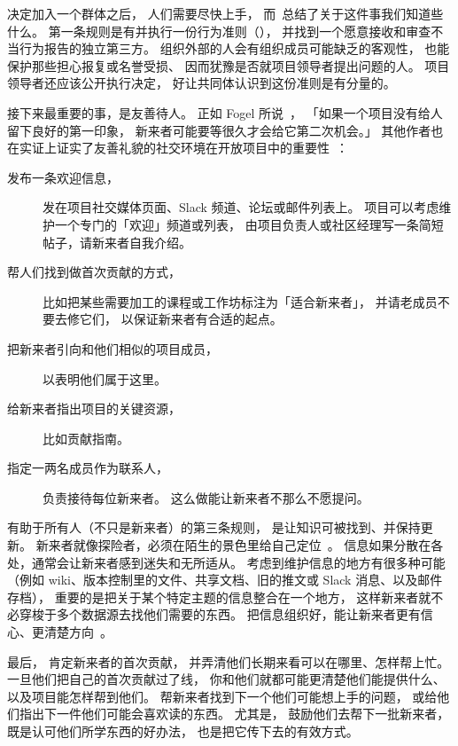 
决定加入一个群体之后，
人们需要尽快上手，
而~\cite{Shol2019}总结了关于这件事我们知道些什么。
第一条规则是有并执行一份行为准则（），
并找到一个愿意接收和审查不当行为报告的独立第三方。
组织外部的人会有组织成员可能缺乏的客观性，
也能保护那些担心报复或名誉受损、
因而犹豫是否就项目领导者提出问题的人。
项目领导者还应该公开执行决定，
好让共同体认识到这份准则是有分量的。

接下来最重要的事，是友善待人。
正如 Fogel 所说~\cite{Foge2005}，
「如果一个项目没有给人留下良好的第一印象，
新来者可能要等很久才会给它第二次机会。」
其他作者也在实证上证实了友善礼貌的社交环境在开放项目中的重要性~\cite{Sing2012,Stei2013,Stei2018}：

\begin{description}

\item[发布一条欢迎信息，]
  发在项目社交媒体页面、Slack 频道、论坛或邮件列表上。
  项目可以考虑维护一个专门的「欢迎」频道或列表，
  由项目负责人或社区经理写一条简短帖子，请新来者自我介绍。

\item[帮人们找到做首次贡献的方式，]
  比如把某些需要加工的课程或工作坊标注为「适合新来者」，
  并请老成员不要去修它们，
  以保证新来者有合适的起点。

\item[把新来者引向和他们相似的项目成员，]
  以表明他们属于这里。

\item[给新来者指出项目的关键资源，]
  比如贡献指南。

\item[指定一两名成员作为联系人，]
  负责接待每位新来者。
  这么做能让新来者不那么不愿提问。

\end{description}

有助于所有人（不只是新来者）的第三条规则，
是让知识可被找到、并保持更新。
新来者就像探险者，必须在陌生的景色里给自己定位~\cite{Dage2010}。
信息如果分散在各处，通常会让新来者感到迷失和无所适从。
考虑到维护信息的地方有很多种可能
（例如 wiki、版本控制里的文件、共享文档、旧的推文或 Slack 消息、以及邮件存档），
重要的是把关于某个特定主题的信息整合在一个地方，
这样新来者就不必穿梭于多个数据源去找他们需要的东西。
把信息组织好，能让新来者更有信心、更清楚方向~\cite{Stei2016}。

最后，
肯定新来者的首次贡献，
并弄清他们长期来看可以在哪里、怎样帮上忙。
一旦他们把自己的首次贡献过了线，
你和他们就都可能更清楚他们能提供什么、以及项目能怎样帮到他们。
帮新来者找到下一个他们可能想上手的问题，
或给他们指出下一件他们可能会喜欢读的东西。
尤其是，
鼓励他们去帮下一批新来者，
既是认可他们所学东西的好办法，
也是把它传下去的有效方式。

